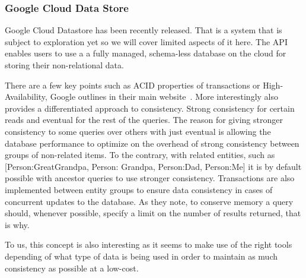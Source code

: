 

\subsubsection{Google Cloud Data Store}
Google Cloud Datastore has been recently released. That is a system that is subject to exploration yet so we will cover limited aspects of it here. The API enables users to use a a fully managed, schema-less database on the cloud for storing their non-relational data.

There are a few key points such as ACID properties of transactions or High-Availability, Google outlines in their main website~\cite{GoogleCloudDataStore}. More interestingly also provides a differentiated approach to consistency. Strong consistency for certain reads and eventual for the rest of the queries. The reason for giving stronger consistency to some queries over others with just eventual is allowing the database performance to optimize on the overhead of strong consistency between groups of non-related items. To the contrary, with related entities, such as [Person:GreatGrandpa, Person: Grandpa, Person:Dad, Person:Me] it is by default possible with ancestor queries to use stronger consistency. Transactions are also implemented between entity groups to ensure data consistency in cases of concurrent updates to the database. As they note, to conserve memory a query should, whenever possible, specify a limit on the number of results returned, that is why.

To us, this concept is also interesting as it seems to make use of the right tools depending of what type of data is being used in order to maintain as much consistency as possible at a low-cost.

